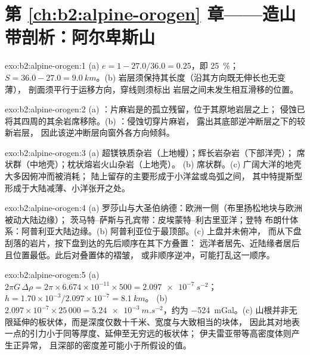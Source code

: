 \section*{第 \ref{ch:b2:alpine-orogen} 章——造山带剖析：阿尔卑斯山}

\begin{solution}{exo:b2:alpine-orogen:1}
(a) $e = 1 - 27.0/36.0 = 0.25$，即 \qty{25}{\percent}；$S = 36.0 - 27.0 =
\qty{9.0}{km}$。(b) 岩层须保持其长度（沿其方向既无伸长也无变薄），
剖面须平行于运移方向，穿线则须标出
岩层之间未发生相互滑移的位置。
\end{solution}

\begin{solution}{exo:b2:alpine-orogen:2}
(a) ：片麻岩是的孤立残留，位于其原地岩层之上；
侵蚀已将其四周的其余岩席移除。(b) ：侵蚀切穿片麻岩，
露出其底部逆冲断层之下的较新岩层，
因此该逆冲断层向窗外各方向倾斜。
\end{solution}

\begin{solution}{exo:b2:alpine-orogen:3}
(a) 超镁铁质杂岩（上地幔）；辉长岩杂岩（下部洋壳）；
席状群（中地壳）；枕状熔岩火山杂岩（上地壳）。
(b) 席状群。(c) 广阔大洋的地壳大多因俯冲而被消耗；
陆上留存的主要形成于小洋盆或岛弧之间，
其中特提斯型形成于大陆减薄、小洋张开之处。
\end{solution}

\begin{solution}{exo:b2:alpine-orogen:4}
(a) 罗莎山与大圣伯纳德：欧洲一侧（布里扬松地块与欧洲被动大陆边缘）；
茨马特–萨斯与孔宾带：皮埃蒙特–利古里亚洋；登特
布朗什体系：阿普利亚大陆边缘。(b) 阿普利亚位于最顶部。(c) 上盘并未俯冲，
而从下盘刮落的岩片，按下盘到达的先后顺序在其下方叠置：
远洋者居先、近陆缘者居后且位置最低。此后对叠置体的褶皱，
或非顺序逆冲，可能打乱这一顺序。
\end{solution}

\begin{solution}{exo:b2:alpine-orogen:5}
(a) $2\pi G\,\Delta\rho = 2\pi\times6.674\times10^{-11}\times500 =
\qty{2.097e-7}{s^{-2}}$；$h = 1.70\times10^{-3}/2.097\times10^{-7} = \qty{8.1}{km}$。
(b) $2.097\times10^{-7}\times25\,000 = \qty{5.24e-3}{m.s^{-2}}$，约为
\qty{-524}{mGal}。(c) 山根并非无限延伸的板状体，而是深度仅数十千米、宽度与大致相当的块体，
因此其对地表一点的引力小于同等厚度、延伸至无穷远的板状体；
伊夫雷亚带等高密度体则产生正异常，
且深部的密度差可能小于所假设的值。
\end{solution}

